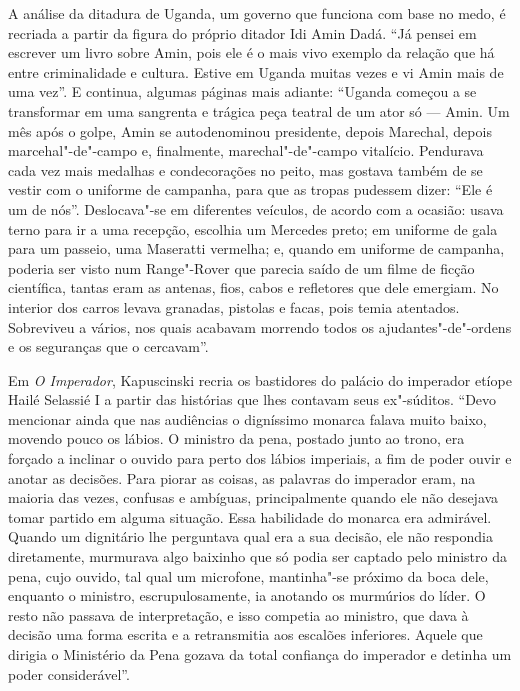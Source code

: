 A análise da ditadura de Uganda, um governo que funciona com base no
medo, é recriada a partir da figura do próprio ditador Idi Amin Dadá.
``Já pensei em escrever um livro sobre Amin, pois ele é o mais vivo
exemplo da relação que há entre criminalidade e cultura. Estive em
Uganda muitas vezes e vi Amin mais de uma vez''. E continua, algumas
páginas mais adiante: ``Uganda começou a se transformar em uma sangrenta
e trágica peça teatral de um ator só --- Amin. Um mês após o golpe, Amin
se autodenominou presidente, depois Marechal, depois marcehal"-de"-campo
e, finalmente, marechal"-de"-campo vitalício. Pendurava cada vez mais
medalhas e condecorações no peito, mas gostava também de se vestir com o
uniforme de campanha, para que as tropas pudessem dizer: ``Ele é um de
nós''. Deslocava"-se em diferentes veículos, de acordo com a ocasião:
usava terno para ir a uma recepção, escolhia um Mercedes preto; em
uniforme de gala para um passeio, uma Maseratti vermelha; e, quando em
uniforme de campanha, poderia ser visto num Range"-Rover que parecia
saído de um filme de ficção científica, tantas eram as antenas, fios,
cabos e refletores que dele emergiam. No interior dos carros levava
granadas, pistolas e facas, pois temia atentados. Sobreviveu a vários,
nos quais acabavam morrendo todos os ajudantes"-de"-ordens e os seguranças
que o cercavam''.

Em \emph{O Imperador}, Kapuscinski recria os bastidores do palácio do
imperador etíope Hailé Selassié I a partir das histórias que lhes
contavam seus ex"-súditos. ``Devo mencionar ainda que nas audiências o
digníssimo monarca falava muito baixo, movendo pouco os lábios. O
ministro da pena, postado junto ao trono, era forçado a inclinar o
ouvido para perto dos lábios imperiais, a fim de poder ouvir e anotar as
decisões. Para piorar as coisas, as palavras do imperador eram, na
maioria das vezes, confusas e ambíguas, principalmente quando ele não
desejava tomar partido em alguma situação. Essa habilidade do monarca
era admirável. Quando um dignitário lhe perguntava qual era a sua
decisão, ele não respondia diretamente, murmurava algo baixinho que só
podia ser captado pelo ministro da pena, cujo ouvido, tal qual um
microfone, mantinha"-se próximo da boca dele, enquanto o ministro,
escrupulosamente, ia anotando os murmúrios do líder. O resto não passava
de interpretação, e isso competia ao ministro, que dava à decisão uma
forma escrita e a retransmitia aos escalões inferiores. Aquele que
dirigia o Ministério da Pena gozava da total confiança do imperador e
detinha um poder considerável''.

